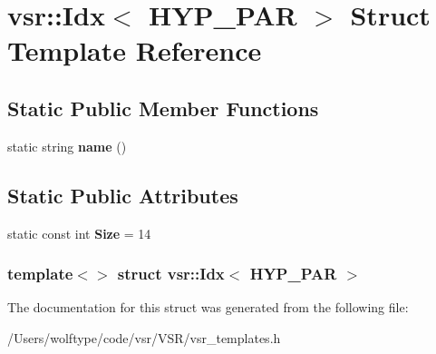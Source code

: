 \hypertarget{structvsr_1_1_idx_3_01_h_y_p___p_a_r_01_4}{\section{vsr\-:\-:Idx$<$ H\-Y\-P\-\_\-\-P\-A\-R $>$ Struct Template Reference}
\label{structvsr_1_1_idx_3_01_h_y_p___p_a_r_01_4}
}
\subsection*{Static Public Member Functions}
\begin{DoxyCompactItemize}
\item 
\hypertarget{structvsr_1_1_idx_3_01_h_y_p___p_a_r_01_4_a2b3f19851e658b523f9f361e327a9637}{static string {\bfseries name} ()}\label{structvsr_1_1_idx_3_01_h_y_p___p_a_r_01_4_a2b3f19851e658b523f9f361e327a9637}

\end{DoxyCompactItemize}
\subsection*{Static Public Attributes}
\begin{DoxyCompactItemize}
\item 
\hypertarget{structvsr_1_1_idx_3_01_h_y_p___p_a_r_01_4_ab005291d0abed9d24bb20fa2f700880b}{static const int {\bfseries Size} = 14}\label{structvsr_1_1_idx_3_01_h_y_p___p_a_r_01_4_ab005291d0abed9d24bb20fa2f700880b}

\end{DoxyCompactItemize}
\subsubsection*{template$<$$>$ struct vsr\-::\-Idx$<$ H\-Y\-P\-\_\-\-P\-A\-R $>$}



The documentation for this struct was generated from the following file\-:\begin{DoxyCompactItemize}
\item 
/\-Users/wolftype/code/vsr/\-V\-S\-R/vsr\-\_\-templates.\-h\end{DoxyCompactItemize}
